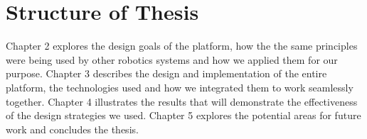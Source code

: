 \section{Structure of Thesis}
Chapter 2 explores the design goals of the \xten platform, how the the same principles were being used by other robotics systems and how we applied them for our purpose. 
Chapter 3 describes the design and implementation of the entire platform, the technologies used and how we integrated them to work seamlessly together.
Chapter 4 illustrates the results that will demonstrate the effectiveness of the design strategies we used.
Chapter 5 explores the potential areas for future work and concludes the thesis.


